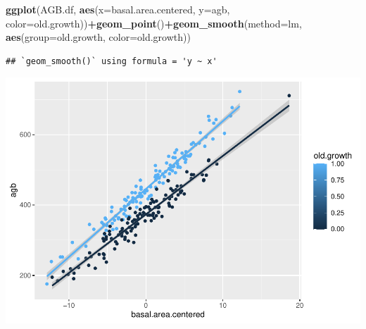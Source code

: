 \documentclass[
]{article}
\newenvironment{Shaded}{\begin{snugshade}}{\end{snugshade}}
\newcommand{\AttributeTok}[1]{\textcolor[rgb]{0.13,0.29,0.53}{#1}}
\newcommand{\FunctionTok}[1]{\textcolor[rgb]{0.13,0.29,0.53}{\textbf{#1}}}
\newcommand{\NormalTok}[1]{#1}
\newcommand{\SpecialCharTok}[1]{\textcolor[rgb]{0.81,0.36,0.00}{\textbf{#1}}}
\begin{document}
\begin{Shaded}
\begin{Highlighting}[]
\FunctionTok{ggplot}\NormalTok{(AGB.df, }\FunctionTok{aes}\NormalTok{(}\AttributeTok{x=}\NormalTok{basal.area.centered, }\AttributeTok{y=}\NormalTok{agb, }\AttributeTok{color=}\NormalTok{old.growth))}\SpecialCharTok{+}\FunctionTok{geom\_point}\NormalTok{()}\SpecialCharTok{+}\FunctionTok{geom\_smooth}\NormalTok{(}\AttributeTok{method=}\NormalTok{lm, }\FunctionTok{aes}\NormalTok{(}\AttributeTok{group=}\NormalTok{old.growth, }\AttributeTok{color=}\NormalTok{old.growth))}
\end{Highlighting}
\end{Shaded}

\begin{verbatim}
## `geom_smooth()` using formula = 'y ~ x'
\end{verbatim}

\includegraphics{Stats-Lab-7_files/figure-latex/unnamed-chunk-10-1.pdf}
\end{document}
